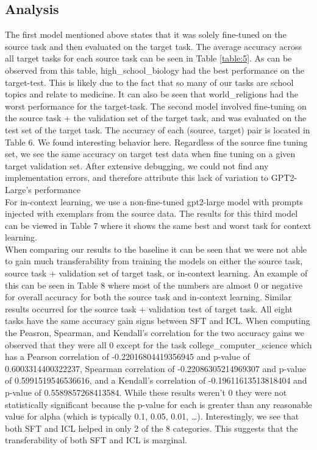 \documentclass[10pt]{article}
\begin{document}
\subsection{Analysis}

The first model mentioned above states that it was solely fine-tuned on the source task and then evaluated on the 
target task. The average accuracy across all target tasks for each source task can be seen in Table \ref{table:5}. 
As can be observed from this table, high\_school\_biology had the best performance on the target-test. This is likely 
due to the fact that so many of our tasks are school topics and relate to medicine. It can also be seen that 
world\_religions had the worst performance for the target-task. The second model involved fine-tuning on the 
source task + the validation set of the target task, and was evaluated on the test set of the target task. 
The accuracy of each (source, target) pair is located in Table 6. We found interesting behavior here. Regardless 
of the source fine tuning set, we see the same accuracy on target test data when fine tuning on a given target 
validation set. After extensive debugging, we could not find any implementation errors, and therefore attribute 
this lack of variation to GPT2-Large’s performance\\

For in-context learning, we use a non-fine-tuned gpt2-large model with prompts injected with exemplars from the 
source data. The results for this third model can be viewed in Table 7 where it shows the same best and worst task for 
context learning. \\

When comparing our results to the baseline it can be seen that we were not able to gain much transferability from training 
the models on either the source task, source task + validation set of target task, or in-context learning. An example of 
this can be seen in Table 8 where most of the numbers are almost 0 or negative for overall accuracy for both the source 
task and in-context learning. Similar results occurred for the source task + validation test of target task. All eight 
tasks have the same accuracy gain signs between SFT and ICL. When computing the Peasron, Spearman, and Kendall’s 
correlation for the two accuracy gains we observed that they were all 0 except for the task college\_computer\_science which 
has a Pearson correlation of -0.22016804419356945 and p-value of 0.6003314400322237, Spearman correlation of 
-0.22086305214969307 and p-value of 0.5991519546536616, and a Kendall’s correlation of -0.19611613513818404 and p-value of 
0.5589857268413584. While these results weren’t 0 they were not statistically significant because the p-value for each is 
greater than any reasonable value for alpha (which is typically 0.1, 0.05, 0.01, …). Interestingly, we see that both SFT 
and ICL helped in only 2 of the 8 categories. This suggests that the transferability of both SFT and ICL is marginal.
\end{document}
